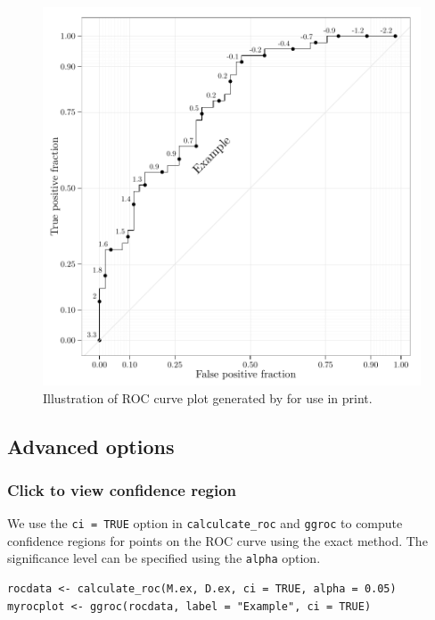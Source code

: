 \documentclass[article]{jss}
\begin{document}
\begin{figure}[htbp]
\centering
\includegraphics{figure/print-1.pdf}
\caption{Illustration of ROC curve plot generated by  for
use in print. \label{first}}
\end{figure}

\subsection{Advanced options}\label{advanced-options}

\subsubsection{Click to view confidence
region}\label{click-to-view-confidence-region}

We use the \texttt{ci = TRUE} option in \texttt{calculcate\_roc} and
\texttt{ggroc} to compute confidence regions for points on the ROC curve
using the \citet{clopper1934use} exact method. The significance level
can be specified using the \texttt{alpha} option.

\begin{verbatim}
rocdata <- calculate_roc(M.ex, D.ex, ci = TRUE, alpha = 0.05)
myrocplot <- ggroc(rocdata, label = "Example", ci = TRUE)
\end{verbatim}
\end{document}
